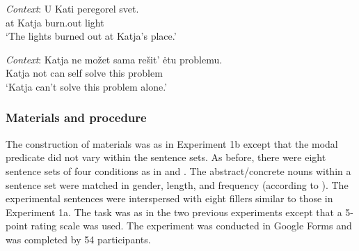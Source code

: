 \documentclass[output=paper]{langscibook}
\begin{document}
\ea \gll \textit{Context}: U Kati peregorel svet. \label{materials-exp2-anim}\\
{} at Katja burn.out light\\
\glt \hspace{1.3cm} `The lights burned out at Katja's place.'
\z \z

\ea \gll \textit{Context}: Katja ne možet sama rešit' ėtu problemu. \label{materials-exp2-inan}\\
{} Katja not can self solve this problem\\
\glt \hspace{1.3cm} `Katja can't solve this problem alone.'
\z\z

\subsubsection{Materials and procedure}

 The construction of materials was as in Experiment 1b except that the modal predicate did not vary within the sentence sets. As before, there were eight sentence sets of four conditions as in  and . The abstract/concrete nouns within a sentence set were matched in gender, length, and frequency (according to \citealt{Ljasevskaja.Sarov2009}). The experimental sentences were interspersed with eight fillers similar to those in Experiment 1a. The task was as in the two previous experiments except that a 5-point rating scale was used. The experiment was conducted in Google Forms and was completed by 54 participants.
\end{document}
